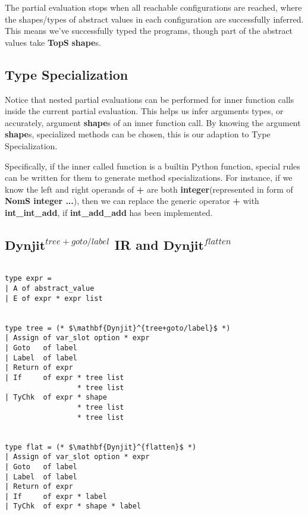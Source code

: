 \documentclass[conference]{IEEEtran}
\begin{document}
The partial evaluation stops when all reachable configurations are reached, where the shapes/types of abstract values
in each configuration are successfully inferred. This means we've successfully typed the programs, though part of the abstract values take \textbf{TopS} \textbf{shape}s.

\subsection{Type Specialization}

Notice that nested partial evaluations can be performed for inner function calls inside the current partial evaluation.
This helps us infer arguments types, or accurately, argument \textbf{shape}s of an inner function call.
By knowing the argument \textbf{shape}s, specialized methods can be chosen, this is our adaption to Type Specialization.

Specifically, if the inner called function is a builtin Python function, special rules can be written for them to generate
method specializations. For instance, if we know the left and right operands of
 \textbf{+} are both \textbf{integer}(represented in form of \textbf{NomS integer ...}),
then we can replace the generic operator \textbf{+} with \textbf{int\_int\_add}, if \textbf{int\_add\_add} has been implemented.

\subsection{$\mathbf{Dynjit}^{tree+goto/label}$ IR and $\mathbf{Dynjit}^{flatten}$}

\lstset{language=Caml, showlines=true, mathescape=true}
\begin{lstlisting}

type expr =
| A of abstract_value 
| E of expr * expr list


type tree = (* $\mathbf{Dynjit}^{tree+goto/label}$ *)
| Assign of var_slot option * expr
| Goto   of label
| Label  of label
| Return of expr
| If     of expr * tree list
                 * tree list
| TyChk  of expr * shape
                 * tree list
                 * tree list


type flat = (* $\mathbf{Dynjit}^{flatten}$ *)
| Assign of var_slot option * expr
| Goto   of label
| Label  of label
| Return of expr
| If     of expr * label
| TyChk  of expr * shape * label

\end{lstlisting}
\end{document}
